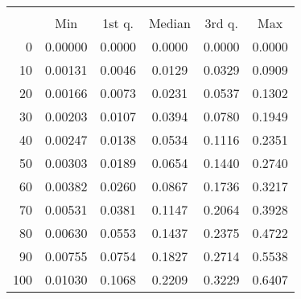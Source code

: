 \begin{tabular}{r|ccccc}
  \multicolumn{6}{c}{{\bf }} \\
  & Min & 1st q. & Median & 3rd q. & Max \\ \hline\hline
  0 & 0.00000 & 0.0000 & 0.0000 & 0.0000 & 0.0000
\\ 10 & 0.00131 & 0.0046 & 0.0129 & 0.0329 & 0.0909
\\ 20 & 0.00166 & 0.0073 & 0.0231 & 0.0537 & 0.1302
\\ 30 & 0.00203 & 0.0107 & 0.0394 & 0.0780 & 0.1949
\\ 40 & 0.00247 & 0.0138 & 0.0534 & 0.1116 & 0.2351
\\ 50 & 0.00303 & 0.0189 & 0.0654 & 0.1440 & 0.2740
\\ 60 & 0.00382 & 0.0260 & 0.0867 & 0.1736 & 0.3217
\\ 70 & 0.00531 & 0.0381 & 0.1147 & 0.2064 & 0.3928
\\ 80 & 0.00630 & 0.0553 & 0.1437 & 0.2375 & 0.4722
\\ 90 & 0.00755 & 0.0754 & 0.1827 & 0.2714 & 0.5538
\\ 100 & 0.01030 & 0.1068 & 0.2209 & 0.3229 & 0.6407
\end{tabular}
